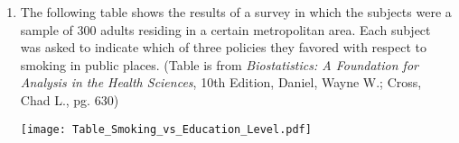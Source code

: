 \documentclass[12pt]{article}
\begin{document}
\begin{enumerate}
%
%





\item  \label{Ch9_Smoking_vs_Education} 
The following table shows the results of a survey in which the subjects were a sample of 300 adults residing in a certain metropolitan area. Each subject was asked to indicate which of three policies they favored with respect to smoking in public places. (Table is from\emph{ Biostatistics: A Foundation for Analysis in the Health Sciences}, 10th Edition, Daniel, Wayne W.; Cross, Chad L., pg. 630)

\begin{center}
  \texttt{[image: Table\_Smoking\_vs\_Education\_Level.pdf]}
\end{center}


\end{enumerate}
\end{document}
